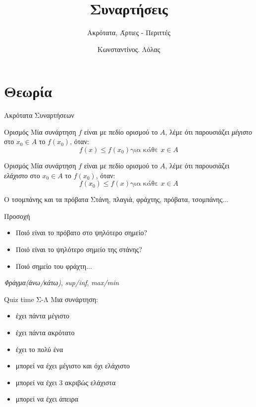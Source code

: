 \documentclass[greek]{beamer}
\title{Συναρτήσεις}
\subtitle{Ακρότατα, Άρτιες - Περιττές}
\author[Λόλας]{Κωνσταντίνος. Λόλας}
\date{}
\begin{document}
\begin{frame}
 \titlepage
\end{frame}

\section{Θεωρία}
\begin{frame}{Ακρότατα Συναρτήσεων}
 \begin{block}{Ορισμός}
  Μία συνάρτηση $f$ είναι με πεδίο ορισμού το $Α$, λέμε ότι παρουσιάζει \emph{μέγιστο} στο $x_0\in Α$ το $f(x_0)$, όταν:
  $$f(x)\le f(x_0)\text{για κάθε } x\in Α$$
 \end{block} \pause
 \begin{block}{Ορισμός}
  Μία συνάρτηση $f$ είναι με πεδίο ορισμού το $Α$, λέμε ότι παρουσιάζει \emph{ελάχιστο} στο $x_0\in Α$ το $f(x_0)$, όταν:
  $$f(x_0)\le f(x)\text{για κάθε } x\in Α$$
 \end{block}
\end{frame}

\begin{frame}{Ο τσομπάνης και τα πρόβατα}
 Στάνη, πλαγιά, φράχτης, πρόβατα, τσομπάνης... \pause
 \begin{alertblock}{Προσοχή}
  \begin{itemize}
   \item Ποιό είναι το πρόβατο στο ψηλότερο σημείο?
   \item Ποιό είναι το ψηλότερο σημείο της στάνης?
   \item Ποιό σημείο του φράχτη...
  \end{itemize}
 \end{alertblock}
 \emph{Φράγμα(άνω/κάτω)}, \emph{sup/inf}, \emph{max/min}
\end{frame}

\begin{frame}{Quiz time Σ-Λ}
 Μια συνάρτηση:
 \begin{itemize}
  \item έχει πάντα μέγιστο\pause
  \item έχει πάντα ακρότατο\pause
  \item έχει το πολύ ένα \pause
  \item μπορεί να έχει μέγιστο και όχι ελάχιστο \pause
  \item μπορεί να έχει 3 ακριβώς ελάχιστα \pause
  \item μπορεί να έχει άπειρα
 \end{itemize}
\end{frame}
\end{document}
